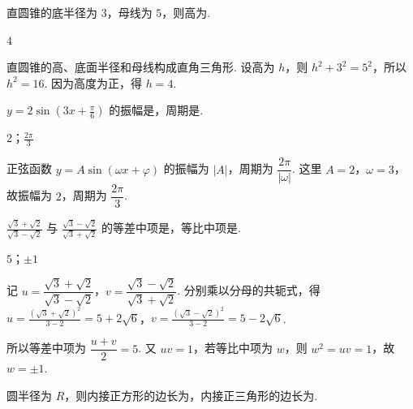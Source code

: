 \begin{problem}
直圆锥的底半径为 \(3\)，母线为 \(5\)，则高为\fillinblank{}.
\end{problem}

\begin{answer}
\(4\)
\end{answer}

\begin{solution}
直圆锥的高、底面半径和母线构成直角三角形. 设高为 \(h\)，则
\(h^2+3^2=5^2\)，所以 \(h^2=16\). 因为高度为正，得 \(h=4\).
\end{solution}

\begin{problem}
\(y=2\sin \left( 3x+\frac{\pi}{6} \right)\) 的振幅是\fillinblank{}，周期是\fillinblank{}.
\end{problem}

\begin{answer}
\(2\)；\(\frac{2\pi}{3}\)
\end{answer}

\begin{solution}
正弦函数 \(y=A\sin\left(\omega x+\varphi\right)\) 的振幅为 \(|A|\)，周期为 \(\dfrac{2\pi}{|\omega|}\). 这里 \(A=2\)，\(\omega=3\)，故振幅为 \(2\)，周期为 \(\dfrac{2\pi}{3}\).
\end{solution}

\begin{problem}
\(\frac{\sqrt{3}+\sqrt{2}}{\sqrt{3}-\sqrt{2}}\) 与 \(\frac{\sqrt{3}-\sqrt{2}}{\sqrt{3}+\sqrt{2}}\) 的等差中项是\fillinblank{}，等比中项是\fillinblank{}.
\end{problem}

\begin{answer}
\(5\)；\(\pm 1\)
\end{answer}

\begin{solution}
记
\(u=\dfrac{\sqrt{3}+\sqrt{2}}{\sqrt{3}-\sqrt{2}}\)，\(v=\dfrac{\sqrt{3}-\sqrt{2}}{\sqrt{3}+\sqrt{2}}\). 分别乘以分母的共轭式，得
\(u=\frac{\left(\sqrt{3}+\sqrt{2}\right)^2}{3-2}=5+2\sqrt{6}\)，\(v=\frac{\left(\sqrt{3}-\sqrt{2}\right)^2}{3-2}=5-2\sqrt{6}\).

所以等差中项为 \(\dfrac{u+v}{2}=5\). 又 \(uv=1\)，若等比中项为 \(w\)，则 \(w^2=uv=1\)，故 \(w=\pm1\).
\end{solution}

\begin{problem}
圆半径为 \(R\)，则内接正方形的边长为\fillinblank{}，内接正三角形的边长为\fillinblank{}.
\end{problem}

